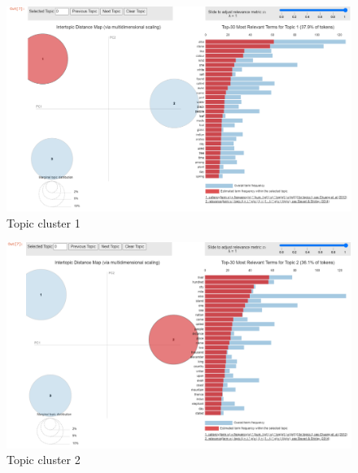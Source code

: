 \documentclass[
  12pt,
]{article}
\begin{document}
\begin{figure}[H]

{\centering \includegraphics{NHthesis_0728_files/figure-pdf/fig-topic_cluster1-output-1.png}

}

\caption{\label{fig-topic_cluster1}Topic cluster 1}

\end{figure}

\begin{figure}[H]

{\centering \includegraphics{NHthesis_0728_files/figure-pdf/fig-topic_cluster2-output-1.png}

}

\caption{\label{fig-topic_cluster2}Topic cluster 2}

\end{figure}
\end{document}

